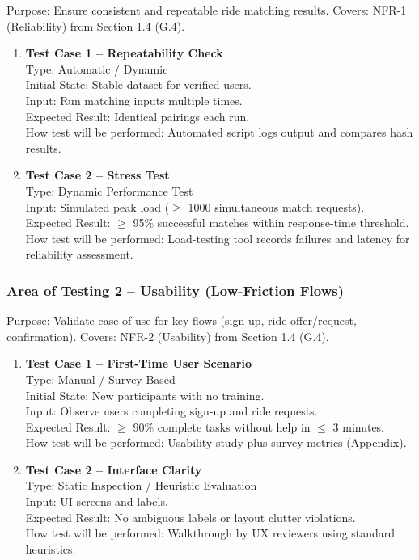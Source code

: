 \documentclass[12pt, titlepage]{article}
\begin{document}
Purpose: Ensure consistent and repeatable ride matching results.  
Covers: NFR-1 (Reliability) from Section 1.4 (G.4).

\begin{enumerate}
\item \textbf{Test Case 1 – Repeatability Check}\\
Type: Automatic / Dynamic\\
Initial State: Stable dataset for verified users.\\
Input: Run matching inputs multiple times.\\
Expected Result: Identical pairings each run.\\
How test will be performed: Automated script logs output and compares hash results.\\[5pt]

\item \textbf{Test Case 2 – Stress Test}\\
Type: Dynamic Performance Test\\
Input: Simulated peak load ($\geq$ 1000 simultaneous match requests).\\
Expected Result: $\geq$ 95\% successful matches within response-time threshold.\\
How test will be performed: Load-testing tool records failures and latency for reliability assessment.\\
\end{enumerate}

\subsubsection{Area of Testing 2 – Usability (Low-Friction Flows)}

Purpose: Validate ease of use for key flows (sign-up, ride offer/request, confirmation).  
Covers: NFR-2 (Usability) from Section 1.4 (G.4).

\begin{enumerate}
\item \textbf{Test Case 1 – First-Time User Scenario}\\
Type: Manual / Survey-Based\\
Initial State: New participants with no training.\\
Input: Observe users completing sign-up and ride requests.\\
Expected Result: $\geq$ 90\% complete tasks without help in $\leq$ 3 minutes.\\
How test will be performed: Usability study plus survey metrics (Appendix).\\[5pt]

\item \textbf{Test Case 2 – Interface Clarity}\\
Type: Static Inspection / Heuristic Evaluation\\
Input: UI screens and labels.\\
Expected Result: No ambiguous labels or layout clutter violations.\\
How test will be performed: Walkthrough by UX reviewers using standard heuristics.\\
\end{enumerate}
\end{document}
